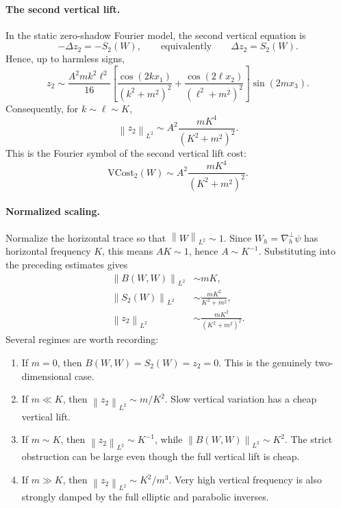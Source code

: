 \documentclass[11pt]{article}
\numberwithin{equation}{section}
\newcommand{\norm}[2]{\left\|#1\right\|_{#2}}
\begin{document}
\paragraph{The second vertical lift.}
In the static zero-shadow Fourier model, the second vertical equation is
\[
-\Delta z_2=-S_2(W),
\qquad\text{equivalently}\qquad
\Delta z_2=S_2(W).
\]
Hence, up to harmless signs,
\begin{equation}\label{eq:z2-fourier}
z_2
\sim
\frac{A^2mk^2\ell^2}{16}
\left[
\frac{\cos(2kx_1)}{(k^2+m^2)^2}
+
\frac{\cos(2\ell x_2)}{(\ell^2+m^2)^2}
\right]\sin(2mx_3).
\end{equation}
Consequently, for \(k\sim\ell\sim K\),
\begin{equation}\label{eq:z2-scaling-unscaled}
\norm{z_2}{L^2}
\sim
A^2\frac{mK^4}{(K^2+m^2)^2}.
\end{equation}
This is the Fourier symbol of the second vertical lift cost:
\begin{equation}\label{eq:VCost2-fourier-symbol}
\mathrm{VCost}_2(W)
\sim
A^2\frac{mK^4}{(K^2+m^2)^2}.
\end{equation}

\paragraph{Normalized scaling.}
Normalize the horizontal trace so that \(\norm{W}{L^2}\sim1\).  Since \(W_h=\nabla_h^\perp\psi\) has horizontal frequency \(K\), this means \(AK\sim1\), hence \(A\sim K^{-1}\).  Substituting into the preceding estimates gives
\begin{align}
\norm{B(W,W)}{L^2}&\sim mK,\label{eq:B-normalized}\\
\norm{S_2(W)}{L^2}&\sim \frac{mK^2}{K^2+m^2},\label{eq:S-normalized}\\
\norm{z_2}{L^2}&\sim \frac{mK^2}{(K^2+m^2)^2}.\label{eq:z-normalized}
\end{align}
Several regimes are worth recording:
\begin{enumerate}[label=(\roman*)]
\item If \(m=0\), then \(B(W,W)=S_2(W)=z_2=0\).  This is the genuinely two-dimensional case.
\item If \(m\ll K\), then \(\norm{z_2}{L^2}\sim m/K^2\).  Slow vertical variation has a cheap vertical lift.
\item If \(m\sim K\), then \(\norm{z_2}{L^2}\sim K^{-1}\), while \(\norm{B(W,W)}{L^2}\sim K^2\).  The strict obstruction can be large even though the full vertical lift is cheap.
\item If \(m\gg K\), then \(\norm{z_2}{L^2}\sim K^2/m^3\).  Very high vertical frequency is also strongly damped by the full elliptic and parabolic inverses.
\end{enumerate}
\end{document}
